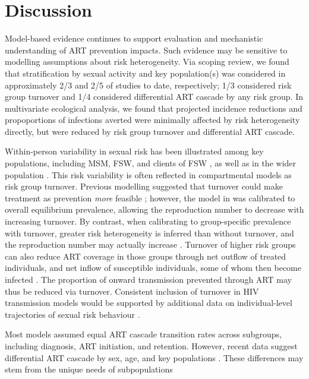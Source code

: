 \section{Discussion}
\label{s:disc}
Model-based evidence continues to support
evaluation and mechanistic understanding of ART prevention impacts.
Such evidence may be sensitive to modelling assumptions about risk heterogeneity.
Via scoping review, we found that stratification by sexual activity and key population(s)
was considered in approximately 2/3 and 2/5 of studies to date, respectively;
1/3 considered risk group turnover and 1/4 considered differential ART cascade by any risk group.
In multivariate ecological analysis, we found that
projected incidence reductions and propoportions of infections averted
were minimally affected by risk heterogeneity directly,
but were reduced by risk group turnover and differential ART cascade.
\par
Within-person variability in sexual risk has been illustrated among key populations,
including MSM, FSW, and clients of FSW \cite{Fazito2012,Romero-Severson2012,Roberts2020},
as well as in the wider population \cite{Houle2018}.
This risk variability is often reflected in compartmental models as risk group turnover.
Previous modelling suggested that
turnover could make treatment as prevention \emph{more} feasible \cite{Henry2015};
however, the model in \cite{Henry2015} was calibrated to overall equilibrium prevalence,
allowing the reproduction number to decrease with increasing turnover.
By contrast, when calibrating to group-specific prevalence with turnover,
greater risk heterogeneity is inferred than without turnover,
and the reproduction number may actually increase \cite{Knight2020}.
Turnover of higher risk groups can also reduce ART coverage in those groups through
net outflow of treated individuals, and net inflow of susceptible individuals,
some of whom then become infected \cite{Knight2020}.
The proportion of onward transmission prevented through ART may thus be reduced via turnover.
Consistent inclusion of turnover in HIV transmission models would be supported by
additional data on individual-level trajectories of sexual risk behaviour \cite{Watts2010}.
\par
Most models assumed equal ART cascade transition rates across subgroups,
including diagnosis, ART initiation, and retention.
However, recent data suggest differential ART cascade by sex, age, and key populations
\cite{Lancaster2016,Stannah2019,Ma2020,Green2020}.
These differences may stem from the unique needs of subpopulations

